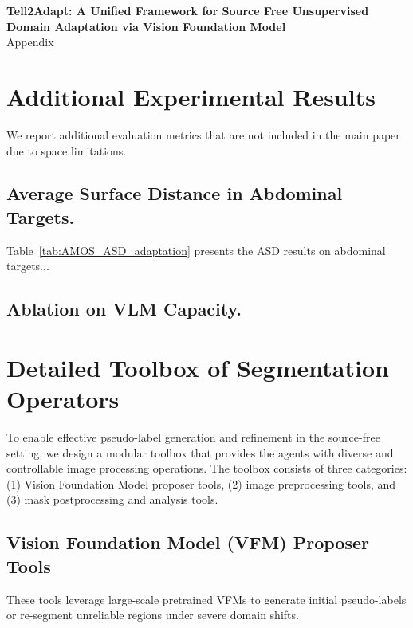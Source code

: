 \documentclass[sigconf]{acmart}
\begin{document}
\onecolumn
{
    \centering
    \Large
    \textbf{Tell2Adapt: A Unified Framework for Source Free Unsupervised Domain Adaptation via Vision Foundation Model}\\
    \vspace{0.5em}Appendix \\
    \vspace{1.0em}
}


\tableofcontents

\onecolumn
\appendix


\section{Additional Experimental Results}

We report additional evaluation metrics that are not included in the main paper due to space limitations.

\subsection{Average Surface Distance in Abdominal Targets.}

Table~\ref{tab:AMOS_ASD_adaptation} presents the ASD results on abdominal targets...

\subsection{Ablation on VLM Capacity.}


\section{Detailed Toolbox of Segmentation Operators}
\label{app:toolbox}

To enable effective pseudo-label generation and refinement in the source-free setting, 
we design a modular toolbox that provides the agents with diverse and controllable 
image processing operations. The toolbox consists of three categories: 
(1) Vision Foundation Model proposer tools, 
(2) image preprocessing tools, and 
(3) mask postprocessing and analysis tools.

\subsection{Vision Foundation Model (VFM) Proposer Tools}

These tools leverage large-scale pretrained VFMs to generate initial pseudo-labels 
or re-segment unreliable regions under severe domain shifts.
\end{document}
